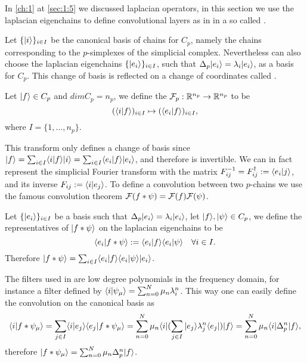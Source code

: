 \documentclass[../3.tex]{subfiles}
\begin{document}
    In \autoref{ch:1} at \autoref{sec:1:5} we discussed laplacian operators, in this section we use the laplacian 
    eigenchains to define convolutional layers as in \cite{simplicialNN} in a so called . 

    Let $\{| i \rangle\}_{i \in I}$ be the canonical basis of chains for $C_p$, namely the chains corresponding to the $p$-simplexes of the simplicial complex.
    Nevertheless can also choose the laplacian eigenchains $\{| e_i \rangle\}_{i \in I}$, such that $\Delta_p| e_i \rangle = \lambda_i| e_i \rangle$, as a basis for $C_p$. This change of basis
    is reflected on a change of coordinates called .

    \begin{defn}
        Let $| f \rangle \in C_p$ and $dimC_p = n_p$, we define the  $\mathcal{F}_p : \mathbb{R}^{n_p} \to \mathbb{R}^{n_p}$ to be
        \[ (\langle i | f \rangle)_{i \in I} \mapsto (\langle e_i | f \rangle)_{i \in I},\]
        where $I = \{1,...,n_p\}$.
    \end{defn}

    This transform only defines a change of basis since $| f \rangle = \sum_{i \in I}\langle i | f \rangle| i \rangle = \sum_{i \in I}\langle e_i | f \rangle| e_i \rangle$, and therefore is invertible.
    We can in fact represent the simplicial Fourier transform with the matrix $F^{-1}_{ij} = F^\dagger_{ij} := \langle e_i | j \rangle$, and its inverse $F_{ij} := \langle i | e_j \rangle$.
    To define a convolution between two $p$-chains we use the famous convolution theorem $\mathcal{F}(f * \psi) = \mathcal{F}(f)\mathcal{F}(\psi)$. 

    \begin{defn}
        Let $\{| e_i \rangle\}_{i \in I}$ be a basis such that $\Delta_p| e_i \rangle = \lambda_i| e_i \rangle$, let $| f \rangle,| \psi \rangle \in C_p$, we define the representatives of $| f * \psi \rangle$ on
        the laplacian eigenchains to be 
        \[ \langle e_i | f * \psi \rangle := \langle e_i | f \rangle\langle e_i | \psi \rangle \quad \forall i \in I.\]
        Therefore $| f * \psi \rangle = \sum_{i \in I}\langle e_i | f \rangle\langle e_i | \psi \rangle| e_i \rangle$.
    \end{defn}

    The filters used in \cite{simplicialNN} are low degree polynomials in the frequency domain, for instance a filter defined by $\langle i | \psi_\mu \rangle = \sum_{n = 0}^N \mu_n \lambda_i^n$.
    This way one can easily define the convolution on the canonical basis as 
    \[\langle i | f * \psi_\mu \rangle = \sum_{j \in I}\langle i | e_j \rangle\langle e_j | f*\psi_\mu \rangle = \sum_{n = 0}^N\mu_n \langle i |(\sum_{j \in I}| e_j \rangle\lambda_j^n\langle e_j |)| f \rangle
     = \sum_{n=0}^N \mu_n \langle i |\Delta_p^n| f \rangle,\]
    therefore $| f*\psi_\mu \rangle = \sum_{n = 0}^N \mu_n \Delta_p^n| f \rangle$.
\end{document}
